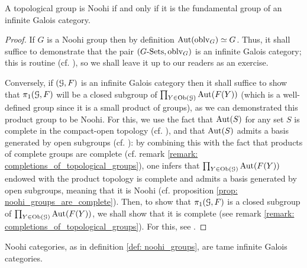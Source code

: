                 \begin{lemma} \label{lemma: fundamental_groups_of_infinite_galois_categories_are_noohi}
                    A topological group is Noohi if and only if it is the fundamental group of an infinite Galois category.
                \end{lemma}
                    \begin{proof}
                        If $G$ is a Noohi group then by definition $\mathrm{Aut}(\mathrm{oblv}_G) \simeq G$. Thus, it shall suffice to demonstrate that the pair $(G\text{-}\mathrm{Sets}, \mathrm{oblv}_G)$ is an infinite Galois category; this is routine (cf. \cite[Section 3]{nlab:category_of_G_sets}), so we shall leave it up to our readers as an exercise.
                    
                        Conversely, if $(\mathcal{G}, F)$ is an infinite Galois category then it shall suffice to show that $\pi_1(\mathcal{G}, F)$ will be a closed subgroup of $\prod_{Y \in \mathrm{Ob}(\mathcal{G})} \mathrm{Aut}(F(Y))$ (which is a well-defined group since it is a small product of groups), as we can demonstrated this product group to be Noohi. For this, we use the fact that $\mathrm{Aut}(S)$ for any set $S$ is complete in the compact-open topology (cf. \cite[Lemma 7.1.4]{bhatt_scholze_2014_pro_etale}), and that $\mathrm{Aut}(S)$ admits a basis generated by open subgroups (cf. \cite[\href{https://stacks.math.columbia.edu/tag/0BMC}{Tag 0BMC}]{stacks}): by combining this with the fact that products of complete groups are complete (cf. remark \ref{remark: completions_of_topological_groups}), one infers that $\prod_{Y \in \mathrm{Ob}(\mathcal{G})} \mathrm{Aut}(F(Y))$ endowed with the product topology is complete and admits a basis generated by open subgroups, meaning that it is Noohi (cf. proposition \ref{prop: noohi_groups_are_complete}). Then, to show that $\pi_1(\mathcal{G}, F)$ is a closed subgroup of $\prod_{Y \in \mathrm{Ob}(\mathcal{G})} \mathrm{Aut}(F(Y))$, we shall show that it is complete (see remark \ref{remark: completions_of_topological_groups}). For this, see \cite[\href{https://stacks.math.columbia.edu/tag/0BMR}{Tag 0BMR}]{stacks}.
                    \end{proof}
                \begin{corollary} \label{coro: noohi_categories_are_tame}
                    Noohi categories, as in definition \ref{def: noohi_groups}, are tame infinite Galois categories. 
                \end{corollary}
                    
